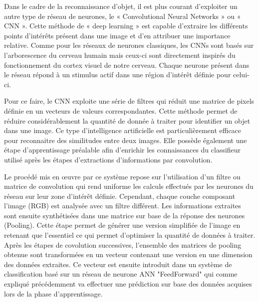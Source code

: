 \documentclass[a4paper,12pt]{article} %
\begin{document}
\newpage
\par
Dans le cadre de la reconnaissance d’objet, il est plus courant d’exploiter un autre type de réseau de neurones, le « Convolutional Neural Networks » ou « CNN ». Cette méthode de « deep learning » est capable d’extraire les différents points d’intérêts présent dans une image et d’en attribuer une importance relative. 
Comme pour les réseaux de neurones classiques, les CNNs sont basés sur l’arborescence du cerveau humain mais ceux-ci sont directement inspirés du fonctionnement du cortex visuel de notre cerveau. Chaque neurone présent dans le réseau répond à un stimulus actif dans une région d’intérêt définie pour celui-ci. \newline
\par
	Pour ce faire, le CNN exploite une série de filtres qui réduit une matrice de pixels définie en un vecteurs de valeurs correspondantes. Cette méthode permet de réduire considérablement la quantité de donnée à traiter pour identifier un objet dans une image. Ce type d’intelligence artificielle est particulièrement efficace pour reconnaitre des similitudes entre deux images. Elle possède également une étape d’apprentissage préalable afin d’enrichir les connaissances du classifieur utilisé après les étapes d’extractions d’informations par convolution. \newline
\par
Le procédé mis en œuvre par ce système repose sur l’utilisation d’un filtre ou matrice de convolution qui rend uniforme les calculs effectués par les neurones du réseau sur leur zone d’intérêt définie. Cependant, chaque couche composant l’image (RGB) est analysée avec un filtre différent. Les informations extraites sont ensuite synthétisées dans une matrice sur base de la réponse des neurones (Pooling). Cette étape permet de générer une version simplifiée de l’image en retenant que l’essentiel ce qui permet d’optimiser la quantité de données à traiter. Après les étapes de covolution successives, l’ensemble des matrices de pooling obtenue sont transformées en un vecteur contenant une version en une dimension des données extraites. Ce vecteur est ensuite introduit dans un système de classification basé sur un réseau de neurone ANN "FeedForward" qui comme expliqué précédemment va effectuer une prédiction sur base des données acquises lors de la phase d’apprentissage. \newline
\end{document}
